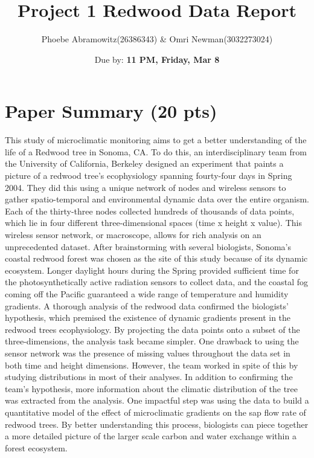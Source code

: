 \documentclass[11pt]{article}
\title{Project 1 Redwood Data Report}
\author{Phoebe Abramowitz(26386343) & Omri Newman(3032273024)}
\date{Due by: \textbf{11 PM, Friday, Mar 8}}
\begin{document}


\maketitle

\section{Paper Summary (20 pts)}

\item This study of microclimatic monitoring aims to get a better understanding of the life of a Redwood tree in Sonoma, CA. To do this, an interdisciplinary team from the University of California, Berkeley designed an experiment that paints a picture of a redwood tree’s ecophysiology spanning fourty-four days in Spring 2004. They did this using a unique network of nodes and wireless sensors to gather spatio-temporal and environmental dynamic data over the entire organism. Each of the thirty-three nodes collected hundreds of thousands of data points, which lie in four different three-dimensional spaces (time x height x value). This wireless sensor network, or macroscope, allows for rich analysis on an unprecedented dataset.
After brainstorming with several biologists, Sonoma’s coastal redwood forest was chosen as the site of this study because of its dynamic ecosystem. Longer daylight hours during the Spring provided sufficient time for the photosynthetically active radiation sensors to collect data, and the coastal fog coming off the Pacific guaranteed a wide range of temperature and humidity gradients.
A thorough analysis of the redwood data confirmed the biologists’ hypothesis, which premised the existence of dynamic gradients present in the redwood trees ecophysiology. By projecting the data points onto a subset of the three-dimensions, the analysis task became simpler.
 One drawback to using the sensor network was the presence of missing values throughout the data set in both time and height dimensions. However, the team worked in spite of this by studying distributions in most of their analyses.  In addition to confirming the team’s hypothesis, more information about the climatic distribution of the tree was extracted from the analysis. One impactful step was using the data to build a quantitative model of the effect of microclimatic gradients on the sap flow rate of redwood trees. By better understanding this process, biologists can piece together a more detailed picture of the larger scale carbon and water exchange within a forest ecosystem.
\end{document}
